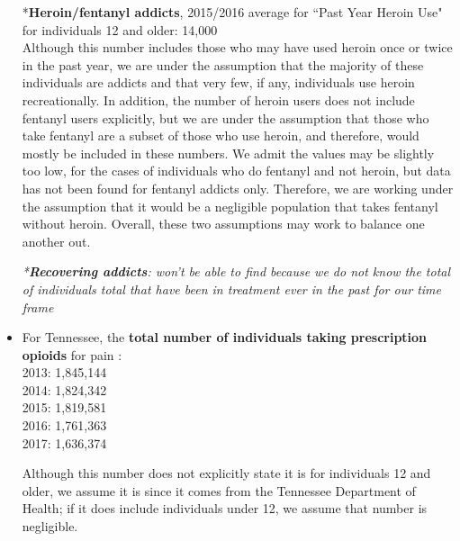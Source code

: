 \documentclass[12pt]{article}
\begin{document}
\begin{itemize}
*\textbf{Heroin/fentanyl addicts}, 2015/2016 average for ``Past Year Heroin Use" for individuals 12 and older: 14,000 \cite{NSDUH2}  \\ 
Although this number includes those who may have used heroin once or twice in the past year, we are under the assumption that the majority of these individuals are addicts and that very few, if any, individuals use heroin recreationally. In addition, the number of heroin users does not include fentanyl users explicitly, but we are under the assumption that those who take fentanyl are a subset of those who use heroin, and therefore, would mostly be included in these numbers. We admit the values may be slightly too low, for the cases of individuals who do fentanyl and not heroin, but data has not been found for fentanyl addicts only. Therefore, we are working under the assumption that it would be a negligible population that takes fentanyl without heroin. Overall, these two assumptions may work to balance one another out. 



\textit{*\textbf{Recovering addicts}: won't be able to find because we do not know the total of individuals total that have been in treatment ever in the past for our time frame}  \\



\item For Tennessee, the \textbf{total number of individuals taking prescription opioids} for pain \cite{TNgov1}: \\
2013: 1,845,144 \\
2014: 1,824,342 \\
2015: 1,819,581 \\
2016: 1,761,363 \\
2017: 1,636,374 

Although this number does not explicitly state it is for individuals 12 and older, we assume it is since it comes from the Tennessee Department of Health; if it does include individuals under 12, we assume that number is negligible. \\


\end{itemize}
\end{document}
